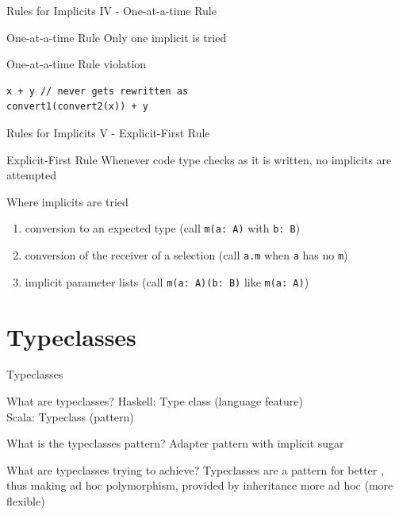 \begin{frame}[fragile]{Rules for Implicits IV - One-at-a-time Rule}
\begin{block}{One-at-a-time Rule}
Only one implicit is tried
\end{block}
\begin{alertblock}{One-at-a-time Rule violation}
\begin{lstlisting}
x + y // never gets rewritten as
convert1(convert2(x)) + y
\end{lstlisting}
\end{alertblock}
\end{frame}

\begin{frame}[fragile]{Rules for Implicits V - Explicit-First Rule}
\begin{block}{Explicit-First Rule}
Whenever code type checks as it is written, no implicits are attempted
\end{block}
\pause
\begin{block}{Where implicits are tried}
\begin{enumerate}
  \item conversion to an expected type (call \lstinline!m(a: A)! with \lstinline!b: B!)
  \item conversion of the receiver of a selection (call \lstinline!a.m! when \lstinline!a! has no \lstinline!m!)
  \item implicit parameter lists (call \lstinline!m(a: A)(b: B)! like \lstinline!m(a: A)!)
\end{enumerate}
\end{block}
\end{frame}

\section{Typeclasses}
\begin{frame}[fragile]{Typeclasses}
\begin{block}{What are typeclasses?}
Haskell: Type class (language feature)\\
Scala: Typeclass (pattern)
\end{block}
\pause
\begin{block}{What is the typeclasses pattern?}
Adapter pattern with implicit sugar
\end{block}
\pause
\begin{block}{What are typeclasses trying to achieve?}
Typeclasses are a pattern for better , thus making ad hoc
polymorphism, provided by inheritance more ad hoc (more flexible)
\end{block}
\end{frame}

